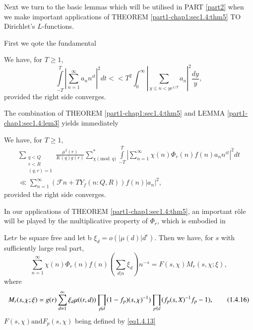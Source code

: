 Next we turn to the basic lemmas which will be utilised  in PART \ref{part2}
when we make important applications of THEOREM
\ref{part1-chap1:sec1.4:thm5} TO Dirichlet's $L$-functions. 

First we qote the fundamental
\begin{Lemma}\label{part1-chap1:sec1.4:lem3}%
  We have, for  $ T \ge 1 $,
  $$
  \int\limits^{T}_{-T} | \sum^{\infty}_{n=1} a_n n^{it} |^2 dt << T^2
  \int^\infty_0 | \sum_{y \leq n < ye^{1/T}} a_n |^2 \frac{dy}{y}, 
  $$
  provided the right side converges.
\end{Lemma}

The combination  of  THEOREM \ref{part1-chap1:sec1.4:thm5} and LEMMA
\ref{part1-chap1:sec1.4:lem3} yields immediately  

\begin{Lemma}\label{part1-chap1:sec1.4:lem4}%
We have, for  $ T \ge 1 $,
   \begin{gather*}
     \sum_{\substack{q < Q \\ r < R \\ (q,r)=1}} \frac{\mu^2
       (r)}{K(q)g(r)} \sum_{\chi \pmod{q}} ^*
     \int\limits^{T}_{-T} | \sum^{\infty}_{n=1} \chi(n) \Phi_r
     (n)f(n)a_n n^{it} |^2 dt \\
     \ll \sum^{\infty}_{n=1} (\mathcal{F}n + TY_f (n:Q,R))f(n) | a_n |^2,
   \end{gather*}
provided the right side converges.
\end{Lemma}

In our applications of  THEOREM \ref{part1-chap1:sec1.4:thm5}, an
important r\^ole will be 
played by the multiplicative property of $\Phi_r$, which is
embodied in  

\begin{Lemma}\label{part1-chap1:sec1.4:lem5}%
Let\pageoriginale $r$ be square free and let b $\xi_d = o(|\mu (d)| d
^\epsilon)$. Then we have, for $s$ with sufficiently large real
part, 
  \begin{equation*}
    \sum_{n=1}^\infty \chi (n) \Phi_r (n) f (n) \left(\sum_{d|n} \xi_d\right)n
    ^{-s} = F (s,\chi )M_r (s, \chi  ; \xi),
    \tag{1.4.15} \label{eq1.4.15} 
\end{equation*}
where
{\fontsize{10pt}{12pt}\selectfont
\begin{equation*}
  M_r (s, \chi; \xi) = g(r) \sum_{d=1}^\infty \xi_d
  \mu((r,d)) \prod_{p|d} (1-f_p) (s,\chi)^{-1}) \prod_{p \not\mid
  d} (f_p (s,X)^{-1} f_p -1), \tag {1.4.16} \label{eq1.4.16}
\end{equation*}}\relax
$F(s,\chi) \text{and} F_p (s,\chi)$ being defined by \eqref{eq1.4.13} 
\end{Lemma}

